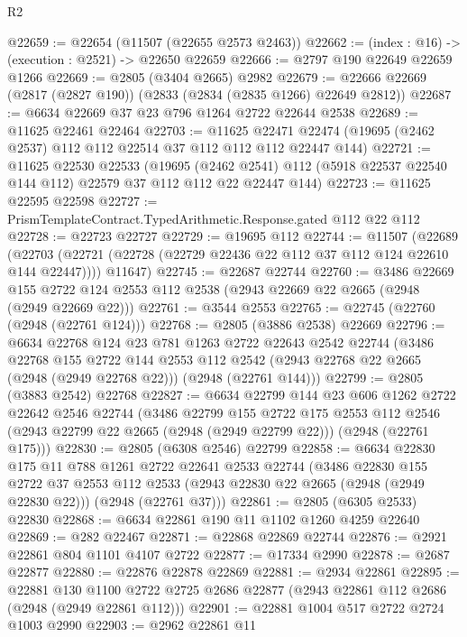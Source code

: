 \begin{lexlean}{R2}
\begin{coremodule}
@22659 := @22654 (@11507 (@22655 @2573 @2463))
@22662 := (index : @16) -> (execution : @2521) -> @22650 @22659
@22666 := @2797 @190 @22649 @22659 @1266
@22669 := @2805 (@3404 @2665) @2982
@22679 := @22666 @22669 (@2817 (@2827 @190)) (@2833 (@2834 (@2835 @1266) @22649 @2812))
@22687 := @6634 @22669 @37 @23 @796 @1264 @2722 @22644 @2538
@22689 := @11625 @22461 @22464
@22703 := @11625
    @22471
    @22474
    (@19695 (@2462 @2537) @112 @112 @22514 @37 @112 @112 @112 @22447 @144)
@22721 := @11625
    @22530
    @22533
    (@19695 (@2462 @2541) @112 (@5918 @22537 @22540 @144 @112) @22579 @37 @112 @112 @22 @22447 @144)
@22723 := @11625 @22595 @22598
@22727 := PrismTemplateContract.TypedArithmetic.Response.gated @112 @22 @112
@22728 := @22723 @22727
@22729 := @19695 @112
@22744 := @11507
    (@22689
      (@22703 (@22721 (@22728 (@22729 @22436 @22 @112 @37 @112 @124 @22610 @144 @22447))))
      @11647)
@22745 := @22687 @22744
@22760 := @3486
    @22669
    @155
    @2722
    @124
    @2553
    @112
    @2538
    (@2943 @22669 @22 @2665 (@2948 (@2949 @22669 @22)))
@22761 := @3544 @2553
@22765 := @22745 (@22760 (@2948 (@22761 @124)))
@22768 := @2805 (@3886 @2538) @22669
@22796 := @6634
    @22768
    @124
    @23
    @781
    @1263
    @2722
    @22643
    @2542
    @22744
    (@3486
      @22768
      @155
      @2722
      @144
      @2553
      @112
      @2542
      (@2943 @22768 @22 @2665 (@2948 (@2949 @22768 @22)))
      (@2948 (@22761 @144)))
@22799 := @2805 (@3883 @2542) @22768
@22827 := @6634
    @22799
    @144
    @23
    @606
    @1262
    @2722
    @22642
    @2546
    @22744
    (@3486
      @22799
      @155
      @2722
      @175
      @2553
      @112
      @2546
      (@2943 @22799 @22 @2665 (@2948 (@2949 @22799 @22)))
      (@2948 (@22761 @175)))
@22830 := @2805 (@6308 @2546) @22799
@22858 := @6634
    @22830
    @175
    @11
    @788
    @1261
    @2722
    @22641
    @2533
    @22744
    (@3486
      @22830
      @155
      @2722
      @37
      @2553
      @112
      @2533
      (@2943 @22830 @22 @2665 (@2948 (@2949 @22830 @22)))
      (@2948 (@22761 @37)))
@22861 := @2805 (@6305 @2533) @22830
@22868 := @6634 @22861 @190 @11 @1102 @1260 @4259 @22640
@22869 := @282 @22467
@22871 := @22868 @22869 @22744
@22876 := @2921 @22861 @804 @1101 @4107 @2722
@22877 := @17334 @2990
@22878 := @2687 @22877
@22880 := @22876 @22878 @22869
@22881 := @2934 @22861
@22895 := @22881
    @130
    @1100
    @2722
    @2725
    @2686
    @22877
    (@2943 @22861 @112 @2686 (@2948 (@2949 @22861 @112)))
@22901 := @22881 @1004 @517 @2722 @2724 @1003 @2990
@22903 := @2962 @22861 @11

\end{coremodule}
\end{lexlean}
